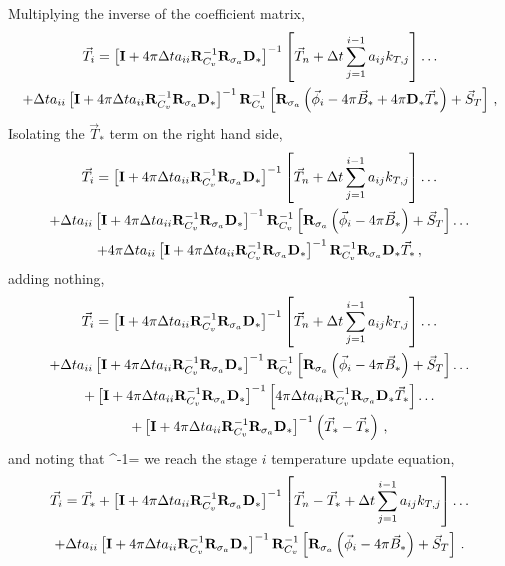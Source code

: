 %
Multiplying the inverse of the coefficient matrix,
%
\begin{multline}
\vec{T}_i = \left[ \mathbf{I} + 4\pi\Delta t a_{ii}\mathbf{R}_{C_v}^{-1}\mathbf{R}_{\sigma_a} \mathbf{D}_*   \right]^{-1}\left[\vec{T}_n + \Delta t \sum_{j=1}^{i-1}{a_{ij} k_{T,j}   }\right] \dots \\
+ \Delta t a_{ii}\left[ \mathbf{I} +  4\pi\Delta t a_{ii}\mathbf{R}_{C_v}^{-1}\mathbf{R}_{\sigma_a} \mathbf{D}_*   \right]^{-1}\mathbf{R}_{C_v}^{-1}\left[
\mathbf{R}_{\sigma_a} \left(\vec{\phi}_i - 4\pi\vec{B}_* + 4\pi \mathbf{D}_* \vec{T}_* \right) + \vec{S}_T 
\right] \, ,
\end{multline}
%
Isolating the $\vec{T}_*$ term on the right hand side,
%
\begin{multline}
\vec{T}_i = \left[ \mathbf{I}  +4\pi\Delta t a_{ii}\mathbf{R}_{C_v}^{-1}\mathbf{R}_{\sigma_a} \mathbf{D}_*   \right]^{-1}\left[\vec{T}_n + \Delta t \sum_{j=1}^{i-1}{a_{ij} k_{T,j}   }\right] \dots \\
+ \Delta t a_{ii}\left[ \mathbf{I}  +4\pi\Delta t a_{ii}\mathbf{R}_{C_v}^{-1}\mathbf{R}_{\sigma_a} \mathbf{D}_*   \right]^{-1}
\mathbf{R}_{C_v}^{-1}\left[ \mathbf{R}_{\sigma_a}\left(\vec{\phi}_i - 4\pi\vec{B}_*\right)  + \vec{S}_T \right]\dots \\
+4\pi\Delta t a_{ii}\left[ \mathbf{I}  + 4\pi\Delta t a_{ii}\mathbf{R}_{C_v}^{-1}\mathbf{R}_{\sigma_a} \mathbf{D}_*   \right]^{-1}
\mathbf{R}_{C_v}^{-1}\mathbf{R}_{\sigma_a} \mathbf{D}_* \vec{T}_* \, ,
\end{multline}
%
%
adding nothing,
\begin{multline}
\vec{T}_i = \left[ \mathbf{I}  + 4\pi\Delta t a_{ii}\mathbf{R}_{C_v}^{-1}\mathbf{R}_{\sigma_a} \mathbf{D}_*   \right]^{-1}\left[\vec{T}_n + \Delta t \sum_{j=1}^{i-1}{a_{ij} k_{T,j}   }\right] \dots \\
+ \Delta t a_{ii}\left[ \mathbf{I} + 4\pi\Delta t a_{ii}\mathbf{R}_{C_v}^{-1}\mathbf{R}_{\sigma_a} \mathbf{D}_*   \right]^{-1}
\mathbf{R}_{C_v}^{-1}\left[\mathbf{R}_{\sigma_a} \left(\vec{\phi}_i -  4\pi\vec{B}_*\right) + \vec{S}_T \right]\dots \\
+\left[ \mathbf{I} + 4\pi\Delta t a_{ii}\mathbf{R}_{C_v}^{-1}\mathbf{R}_{\sigma_a} \mathbf{D}_*   \right]^{-1}
\left[ 4\pi\Delta t a_{ii} \mathbf{R}_{C_v}^{-1}\mathbf{R}_{\sigma_a}   \mathbf{D}_* \vec{T}_* \right]\dots \\
+ \left[ \mathbf{I}  + 4\pi\Delta t a_{ii}\mathbf{R}_{C_v}^{-1}\mathbf{R}_{\sigma_a} \mathbf{D}_*   \right]^{-1} \left( \vec{T}_* - \vec{T}_*\right) \, ,
\end{multline}
%
%
and noting that
\benum
{}^{-1} = \I \pec
\eenum
%
%
we reach the stage $i$ temperature update equation,
\begin{multline}
\vec{T}_i = \vec{T}_*   + \left[ \mathbf{I} + 4\pi\Delta t a_{ii}\mathbf{R}_{C_v}^{-1}\mathbf{R}_{\sigma_a} \mathbf{D}_*   \right]^{-1}\left[\vec{T}_n -\vec{T}_* + \Delta t \sum_{j=1}^{i-1}{a_{ij} k_{T,j}   }\right] \dots \\
+ \Delta t a_{ii}\left[ \mathbf{I}  + 4\pi\Delta t a_{ii}\mathbf{R}_{C_v}^{-1}\mathbf{R}_{\sigma_a} \mathbf{D}_*   \right]^{-1}\mathbf{R}_{C_v}^{-1}
\left[ \mathbf{R}_{\sigma_a}\left(\vec{\phi}_i - 4\pi\vec{B}_*  \right) + \vec{S}_T \right] \, .
\label{eq:Ti_iso}
\end{multline}
